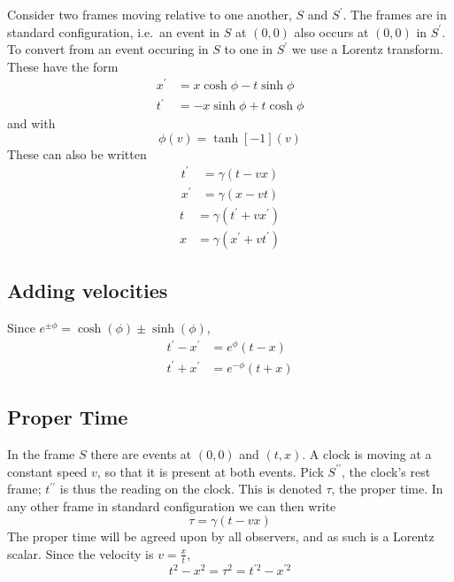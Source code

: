 Consider two frames moving relative to one another, $S$ and
$S^\prime$. The frames are in standard configuration, i.e.\ an event
in $S$ at $(0,0)$ also occurs at $(0,0)$ in $S^\prime$. To convert
from an event occuring in $S$ to one in $S^\prime$ we use a Lorentz
transform. These have the form
\begin{subequations}
\begin{align}
  x^\prime &= x \cosh \phi - t \sinh \phi \\
t^\prime &= -x \sinh \phi + t \cosh \phi
\end{align}
\end{subequations}
and with 
\[ \phi(v) = \tanh[-1](v) \]
These can also be written
\begin{subequations}
  \begin{align}
    t^\prime &= \gamma (t-vx) \\
    x^\prime &= \gamma (x-vt)
  \end{align}
\end{subequations}
\begin{subequations}
  \begin{align}
    t &= \gamma (t^\prime + v x^\prime) \\
    x &= \gamma (x^\prime + v t^\prime)
  \end{align}
\end{subequations}

\subsection{Adding velocities}
\label{sec:addingvel}

Since $e^{\pm \phi} = \cosh(\phi) \pm \sinh(\phi)$,
\begin{subequations}
  \begin{align}
    t^\prime - x^\prime &= e^{\phi} (t-x) \\
    t^\prime + x^\prime &= e^{-\phi} (t+x)
  \end{align}
\end{subequations}

\subsection{Proper Time}
\label{sec:proper-time}

In the frame $S$ there are events at $(0,0)$ and $(t,x)$. A clock is
moving at a constant speed $v$, so that it is present at both
events. Pick $S^{\prime \prime}$, the clock's rest frame; $t^{\prime
  \prime}$ is thus the reading on the clock. This is denoted $\tau$,
the proper time. In any other frame in standard configuration we can then write
\begin{equation}
  \label{eq:1}
  \tau = \gamma(t-vx)
\end{equation}
The proper time will be agreed upon by all observers, and as such is a
Lorentz scalar. Since the velocity is $v = \frac{x}{t}$,
\[ t^2 - x^2 = \tau^2 = t^{\prime 2} - x^{\prime 2} \]

